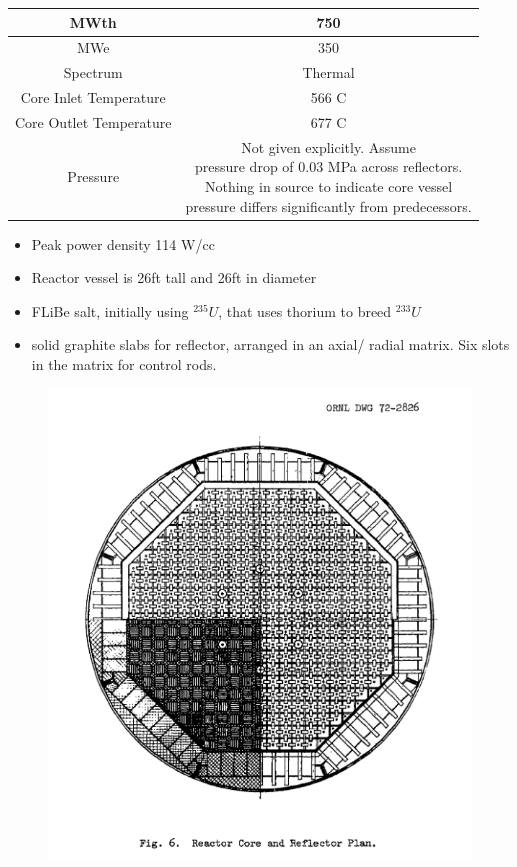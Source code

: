 \documentclass[letterpaper]{article}
\begin{document}
\begin{center}
\begin{tabular}{|c|c|}
\hline
MWth & 750 \\
\hline
MWe & 350 \\
\hline
Spectrum & Thermal \\
\hline
Core Inlet Temperature & 566 C\\
\hline
Core Outlet Temperature & 677 C\\
\hline
Pressure & \makecell{Not given explicitly.  Assume\\pressure drop of 0.03 MPa across reflectors.\\Nothing in source to indicate core vessel\\pressure differs significantly from predecessors.} \\
\hline
\end{tabular}
\end{center}

\begin{itemize}
\item Peak power density 114 W/cc
\item Reactor vessel is 26ft tall and 26ft in diameter
\item FLiBe salt, initially using ${}^{235}U$, that uses thorium to breed ${}^{233}U$
\item solid graphite slabs for reflector, arranged in an axial/ radial matrix.  Six slots in the matrix for control rods.
\end{itemize}

\begin{figure}[H]
  \centering
  \includegraphics[width=1.0\linewidth]{figures/MSDRsource1.png}
  \label{fig:fig5}
\end{figure}
\end{document}
